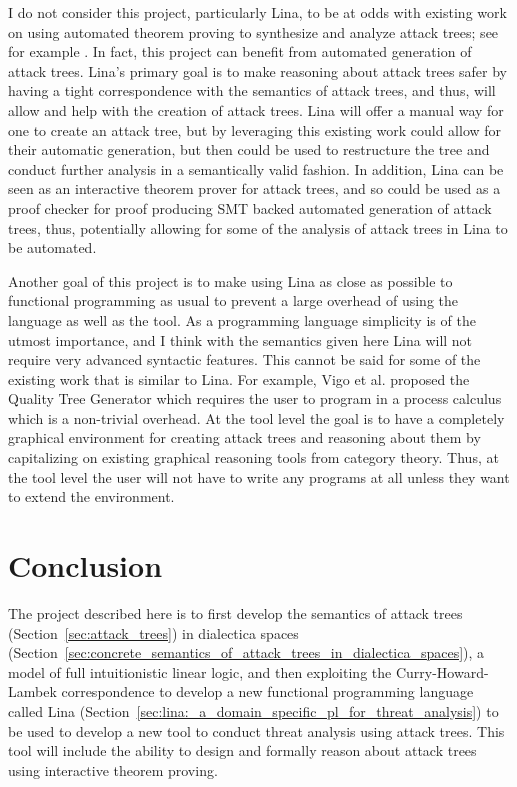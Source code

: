 \documentclass{llncs}
\begin{document}
I do not consider this project, particularly Lina, to be at odds with
existing work on using automated theorem proving to synthesize and
analyze attack trees; see for example
\cite{essay69399,Sheyner:2002:AGA:829514.830526,6957121,essay69402}.
In fact, this project can benefit from automated generation of attack
trees.  Lina's primary goal is to make reasoning about attack trees
safer by having a tight correspondence with the semantics of attack
trees, and thus, will allow and help with the creation of attack
trees.  Lina will offer a manual way for one to create an attack tree,
but by leveraging this existing work could allow for their automatic
generation, but then could be used to restructure the tree and conduct
further analysis in a semantically valid fashion.  In addition, Lina
can be seen as an interactive theorem prover for attack trees, and so
could be used as a proof checker \cite{Stump:2012} for proof producing
SMT backed automated generation of attack trees, thus, potentially
allowing for some of the analysis of attack trees in Lina to be
automated.

Another goal of this project is to make using Lina as close as
possible to functional programming as usual to prevent a large
overhead of using the language as well as the tool.  As a programming
language simplicity is of the utmost importance, and I think with the
semantics given here Lina will not require very advanced syntactic
features.  This cannot be said for some of the existing work that is
similar to Lina.  For example, Vigo et al. \cite{6957121} proposed the
Quality Tree Generator which requires the user to program in a process
calculus which is a non-trivial overhead. At the tool level the goal
is to have a completely graphical environment for creating attack
trees and reasoning about them by capitalizing on existing graphical
reasoning tools from category theory.  Thus, at the tool level the
user will not have to write any programs at all unless they want to
extend the environment.

\section{Conclusion}
\label{sec:conclusion}

The project described here is to first develop the semantics of attack
trees (Section~\ref{sec:attack_trees}) in dialectica spaces
(Section~\ref{sec:concrete_semantics_of_attack_trees_in_dialectica_spaces}),
a model of full intuitionistic linear logic, and then exploiting the
Curry-Howard-Lambek correspondence to develop a new functional
programming language called Lina
(Section~\ref{sec:lina:_a_domain_specific_pl_for_threat_analysis}) to
be used to develop a new tool to conduct threat analysis using attack
trees.  This tool will include the ability to design and formally
reason about attack trees using interactive theorem proving.
\end{document}
